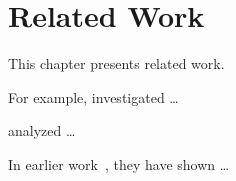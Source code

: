 \section*{Related Work}\label{ch:relatedwork}

This chapter presents related work.

For example, \citet{KG:SME06} investigated \dots

\citet{ABKS:BOOK2013} analyzed \dots

In earlier work~\cite{KAK:GPCE09,ABKS:BOOK2013}, they have shown \dots
